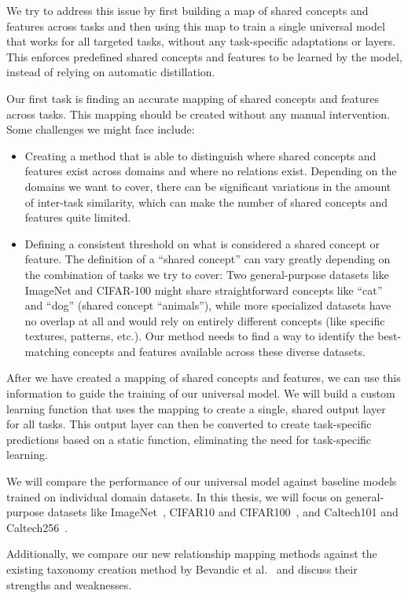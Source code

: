 We try to address this issue by first building a map of shared concepts and features across tasks
and then using this map to train a single universal model that works for all targeted tasks,
without any task-specific adaptations or layers.
This enforces predefined shared concepts and features to be learned by the model,
instead of relying on automatic distillation.

Our first task is finding an accurate mapping of shared concepts and features across tasks.
This mapping should be created without any manual intervention.
Some challenges we might face include:
\begin{itemize}
      \item Creating a method that is able to distinguish where shared concepts and features exist across domains
            and where no relations exist.
            Depending on the domains we want to cover, there can be significant variations in the amount of inter-task similarity,
            which can make the number of shared concepts and features quite limited.
      \item Defining a consistent threshold on what is considered a shared concept or feature.
            The definition of a \enquote{shared concept} can vary greatly depending on the combination of tasks we try to cover:
            Two general-purpose datasets like ImageNet and CIFAR-100 might share straightforward concepts like \enquote{cat} and \enquote{dog} (shared concept \enquote{animals}),
            while more specialized datasets have no overlap at all and would rely on entirely different concepts
            (like specific textures, patterns, etc.).
            Our method needs to find a way to identify the best-matching concepts and features available across these diverse datasets.
\end{itemize}

After we have created a mapping of shared concepts and features, we can use this information to guide the training of our universal model.
We will build a custom learning function that uses the mapping to create a single, shared output layer for all tasks.
This output layer can then be converted to create task-specific predictions based on a static function,
eliminating the need for task-specific learning.

We will compare the performance of our universal model against baseline models trained on individual domain datasets.
In this thesis, we will focus on general-purpose datasets like ImageNet~\cite{deng_imagenet_2009,russakovsky_imagenet_2015},
CIFAR10 and CIFAR100~\cite{krizhevsky_learning_2009}, and Caltech101 and Caltech256~\cite{li_caltech_2022,griffin_caltech_2022}.

Additionally, we compare our new relationship mapping methods against the existing taxonomy creation method
by Bevandic et al.~\cite{bevandic_automatic_2022,bevandic_weakly_2024} and discuss their strengths and weaknesses.